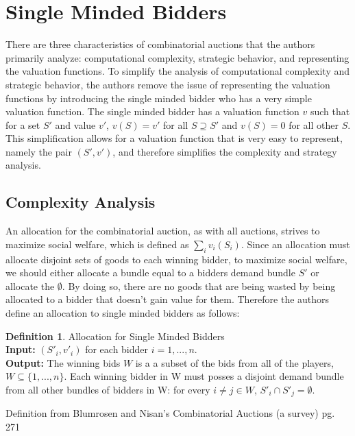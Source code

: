\documentclass[10pt,onecolumn,letterpaper]{article}
\theoremstyle{definition}
\newtheorem{definition}{Definition}[section]
\begin{document}
\section{Single Minded Bidders} %

There are three characteristics of combinatorial auctions that the authors primarily analyze: computational complexity, strategic behavior, and representing the valuation functions. To simplify the analysis of computational complexity and strategic behavior, the authors remove the issue of representing the valuation functions by introducing the single minded bidder who has a very simple valuation function. The single minded bidder has a valuation function $v$ such that for a set $S'$ and value $v'$, $v(S) = v'$ for all $S \supseteq S'$ and $v(S) = 0$ for all other $S$. This simplification allows for a valuation function that is very easy to represent, namely the pair $(S', v')$, and therefore simplifies the complexity and strategy analysis.

\subsection{Complexity Analysis} %
An allocation for the combinatorial auction, as with all auctions, strives to maximize social welfare, which is defined as $\sum_i v_i(S_i)$. Since an allocation must allocate disjoint sets of goods to each winning bidder, to maximize social welfare, we should either allocate a bundle equal to a bidders demand bundle $S'$ or allocate the $\emptyset$. By doing so, there are no goods that are being wasted by being allocated to a bidder that doesn't gain value for them. Therefore the authors define an allocation to single minded bidders as follows:

\theoremstyle{definition}
\begin{definition}{Allocation for Single Minded Bidders}
\\
\textbf{Input:} $(S'_i,v'_i)$ for each bidder $i = 1,...,n$.
\\
\textbf{Output:} The winning bids $W$ is a a subset of the bids from all of the players, $W \subseteq \{1,...,n\}$. Each winning bidder in W must posses a disjoint demand bundle from all other bundles of bidders in W: for every $i \neq j \in W$, $S'_i \cap S'_j = \emptyset$.

Definition from Blumrosen and Nisan's Combinatorial Auctions (a survey) pg. 271 \cite{paper}

\end{definition}
\end{document}
